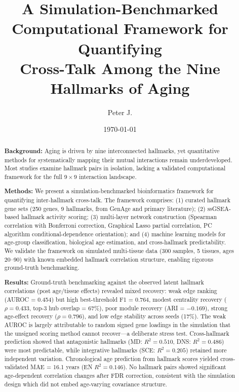 \documentclass[11pt,a4paper]{article}
\title{\textbf{A Simulation-Benchmarked Computational Framework for Quantifying \\
Cross-Talk Among the Nine Hallmarks of Aging}}
\author[1]{Peter J.}
\affil[1]{Department of Bioinformatics and Computational Biology}
\date{\today}
\begin{document}
\maketitle

\begin{abstract}
\noindent
\textbf{Background:} Aging is driven by nine interconnected hallmarks, yet quantitative methods for systematically mapping their mutual interactions remain underdeveloped. Most studies examine hallmark pairs in isolation, lacking a validated computational framework for the full $9 \times 9$ interaction landscape.

\noindent
\textbf{Methods:} We present a simulation-benchmarked bioinformatics framework for quantifying inter-hallmark cross-talk. The framework comprises: (1) curated hallmark gene sets (250 genes, 9 hallmarks, from GenAge and primary literature); (2) ssGSEA-based hallmark activity scoring; (3) multi-layer network construction (Spearman correlation with Bonferroni correction, Graphical Lasso partial correlation, PC algorithm conditional-dependence orientation); and (4) machine learning models for age-group classification, biological age estimation, and cross-hallmark predictability. We validate the framework on simulated multi-tissue data (300 samples, 5 tissues, ages 20--90) with known embedded hallmark correlation structure, enabling rigorous ground-truth benchmarking.

\noindent
\textbf{Results:} Ground-truth benchmarking against the observed latent hallmark correlations (post age/tissue effects) revealed mixed recovery: weak edge ranking (AUROC = 0.454) but high best-threshold F1 = 0.764, modest centrality recovery ($\rho = 0.433$, top-3 hub overlap = 67\%), poor module recovery (ARI = $-0.169$), strong age-effect recovery ($\rho = 0.796$), and low edge stability across seeds (17\%). The weak AUROC is largely attributable to random signed gene loadings in the simulation that the unsigned scoring method cannot recover---a deliberate stress test. Cross-hallmark prediction showed that antagonistic hallmarks (MD: $R^2 = 0.510$, DNS: $R^2 = 0.486$) were most predictable, while integrative hallmarks (SCE: $R^2 = 0.205$) retained more independent variation. Chronological age prediction from hallmark scores yielded cross-validated MAE = 16.1 years (EN $R^2 = 0.146$). No hallmark pairs showed significant age-dependent correlation changes after FDR correction, consistent with the simulation design which did not embed age-varying covariance structure.


\end{abstract}
\end{document}
